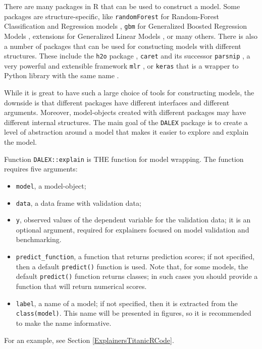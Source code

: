 \documentclass[12pt,]{krantz}
\providecommand{\tightlist}{%
  \setlength{\itemsep}{0pt}\setlength{\parskip}{0pt}}
\begin{document}
There are many packages in R that can be used to construct a model. Some packages are structure-specific, like \texttt{randomForest} for Random-Forest Classification and Regression models \citep{randomForest}, \texttt{gbm} for Generalized Boosted Regression Models \citep{gbm}, extensions for Generalized Linear Models \citep{rms}, or many others. There is also a number of packages that can be used for constucting models with different structures. These include the \texttt{h2o} package \citep{h2oPackage}, \texttt{caret} \citep{caret} and its successor \texttt{parsnip} \citep{parsnipPackage}, a very powerful and extensible framework \texttt{mlr} \citep{mlr}, or \texttt{keras} that is a wrapper to Python library with the same name \citep{kerasPackage}.

While it is great to have such a large choice of tools for constructing models, the downside is that different packages have different interfaces and different arguments. Moreover, model-objects created with different packages may have different internal structures. The main goal of the \texttt{DALEX} package is to create a level of abstraction around a model that makes it easier to explore and explain the model.

Function \texttt{DALEX::explain} is THE function for model wrapping. The function requires five arguments:

\begin{itemize}
\tightlist
\item
  \texttt{model}, a model-object;
\item
  \texttt{data}, a data frame with validation data;
\item
  \texttt{y}, observed values of the dependent variable for the validation data; it is an optional argument, required for explainers focused on model validation and benchmarking.
\item
  \texttt{predict\_function}, a function that returns prediction scores; if not specified, then a default \texttt{predict()} function is used. Note that, for some models, the default \texttt{predict()} function returns classes; in such cases you should provide a function that will return numerical scores.
\item
  \texttt{label}, a name of a model; if not specified, then it is extracted from the \texttt{class(model)}. This name will be presented in figures, so it is recommended to make the name informative.
\end{itemize}

For an example, see Section \ref{ExplainersTitanicRCode}.
\end{document}
